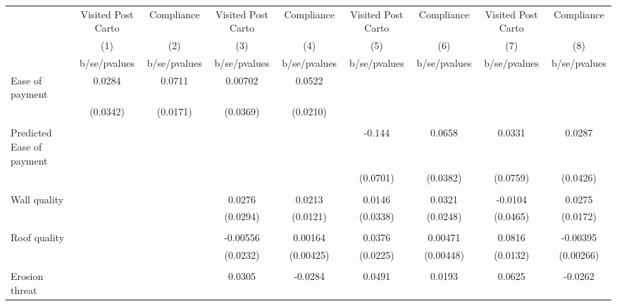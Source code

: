 {
\def\sym#1{\ifmmode^{#1}\else\(^{#1}\)\fi}
\begin{tabular}{l*{8}{c}}
\toprule
                &\multicolumn{1}{c}{Visited Post Carto}&\multicolumn{1}{c}{Compliance}&\multicolumn{1}{c}{Visited Post Carto}&\multicolumn{1}{c}{Compliance}&\multicolumn{1}{c}{Visited Post Carto}&\multicolumn{1}{c}{Compliance}&\multicolumn{1}{c}{Visited Post Carto}&\multicolumn{1}{c}{Compliance}\\
                &\multicolumn{1}{c}{(1)}&\multicolumn{1}{c}{(2)}&\multicolumn{1}{c}{(3)}&\multicolumn{1}{c}{(4)}&\multicolumn{1}{c}{(5)}&\multicolumn{1}{c}{(6)}&\multicolumn{1}{c}{(7)}&\multicolumn{1}{c}{(8)}\\
                &b/se/pvalues&b/se/pvalues&b/se/pvalues&b/se/pvalues&b/se/pvalues&b/se/pvalues&b/se/pvalues&b/se/pvalues\\
\midrule
Ease of payment &   0.0284&   0.0711&  0.00702&   0.0522&         &         &         &         \\
                & (0.0342)& (0.0171)& (0.0369)& (0.0210)&         &         &         &         \\
                &         &         &         &         &         &         &         &         \\
Predicted Ease of payment&         &         &         &         &   -0.144&   0.0658&   0.0331&   0.0287\\
                &         &         &         &         & (0.0701)& (0.0382)& (0.0759)& (0.0426)\\
                &         &         &         &         &         &         &         &         \\
Wall quality    &         &         &   0.0276&   0.0213&   0.0146&   0.0321&  -0.0104&   0.0275\\
                &         &         & (0.0294)& (0.0121)& (0.0338)& (0.0248)& (0.0465)& (0.0172)\\
                &         &         &         &         &         &         &         &         \\
Roof quality    &         &         & -0.00556&  0.00164&   0.0376&  0.00471&   0.0816& -0.00395\\
                &         &         & (0.0232)&(0.00425)& (0.0225)&(0.00448)& (0.0132)&(0.00266)\\
                &         &         &         &         &         &         &         &         \\
Erosion threat  &         &         &   0.0305&  -0.0284&   0.0491&   0.0193&   0.0625&  -0.0262\\

\end{tabular}}
